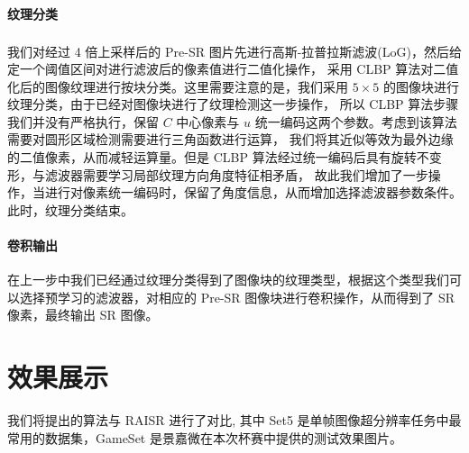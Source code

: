 \documentclass[12pt, a4paper, oneside]{ctexbook}
\begin{document}
	\subsubsection{纹理分类}
	我们对经过 4 倍上采样后的 Pre-SR 图片先进行高斯-拉普拉斯滤波(LoG)\textsuperscript{\cite{12}}，然后给定一个阈值区间对进行滤波后的像素值进行二值化操作，
	采用 CLBP 算法对二值化后的图像纹理进行按块分类。这里需要注意的是，我们采用 $5 \times 5$ 的图像块进行纹理分类，由于已经对图像块进行了纹理检测这一步操作，
	所以 CLBP 算法步骤我们并没有严格执行，保留 $C$ 中心像素与 $u$ 统一编码这两个参数。考虑到该算法需要对圆形区域检测需要进行三角函数进行运算，
	我们将其近似等效为最外边缘的二值像素，从而减轻运算量。但是 CLBP 算法经过统一编码后具有旋转不变形，与滤波器需要学习局部纹理方向角度特征相矛盾，
	故此我们增加了一步操作，当进行对像素统一编码时，保留了角度信息，从而增加选择滤波器参数条件。此时，纹理分类结束。
	\subsubsection{卷积输出}
	在上一步中我们已经通过纹理分类得到了图像块的纹理类型，根据这个类型我们可以选择预学习的滤波器，对相应的 Pre-SR 图像块进行卷积操作，从而得到了 SR 像素，最终输出 SR 图像。
	
	\chapter{效果展示}
	我们将提出的算法与 RAISR 进行了对比,	其中 Set5 是单帧图像超分辨率任务中最常用的数据集，GameSet 是景嘉微在本次杯赛中提供的测试效果图片。
	
\end{document}
